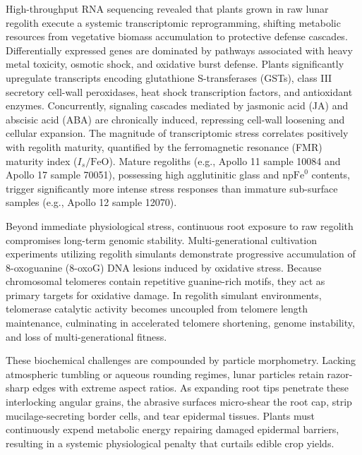 High-throughput RNA sequencing revealed that plants grown in raw lunar regolith execute a systemic transcriptomic reprogramming, shifting metabolic resources from vegetative biomass accumulation to protective defense cascades\cite{paul2022plants,krejci2026lunar}. Differentially expressed genes are dominated by pathways associated with heavy metal toxicity, osmotic shock, and oxidative burst defense\cite{paul2022plants,krejci2026lunar}. Plants significantly upregulate transcripts encoding glutathione S-transferases (GSTs), class III secretory cell-wall peroxidases, heat shock transcription factors, and antioxidant enzymes\cite{paul2022plants,krejci2026lunar}. Concurrently, signaling cascades mediated by jasmonic acid (JA) and abscisic acid (ABA) are chronically induced, repressing cell-wall loosening and cellular expansion\cite{paul2022plants,ming1989lunar}. The magnitude of transcriptomic stress correlates positively with regolith maturity, quantified by the ferromagnetic resonance (FMR) maturity index ($I_s/\mathrm{FeO}$)\cite{paul2022plants,morris1976surface}. Mature regoliths (e.g., Apollo 11 sample 10084 and Apollo 17 sample 70051), possessing high agglutinitic glass and $\mathrm{npFe}^0$ contents, trigger significantly more intense stress responses than immature sub-surface samples (e.g., Apollo 12 sample 12070)\cite{paul2022plants}.

Beyond immediate physiological stress, continuous root exposure to raw regolith compromises long-term genomic stability\cite{barbero2024telomere,shippen2019telomere}. Multi-generational cultivation experiments utilizing regolith simulants demonstrate progressive accumulation of 8-oxoguanine (8-oxoG) DNA lesions induced by oxidative stress\cite{barbero2024telomere}. Because chromosomal telomeres contain repetitive guanine-rich motifs, they act as primary targets for oxidative damage\cite{barbero2024telomere,min2023protection}. In regolith simulant environments, telomerase catalytic activity becomes uncoupled from telomere length maintenance, culminating in accelerated telomere shortening, genome instability, and loss of multi-generational fitness\cite{ming1989lunar,barbero2024telomere}.

These biochemical challenges are compounded by particle morphometry\cite{paul2022plants,ming1989lunar,fackrell2024mechanical}. Lacking atmospheric tumbling or aqueous rounding regimes, lunar particles retain razor-sharp edges with extreme aspect ratios\cite{paul2022plants,ming1989lunar,fackrell2024mechanical}. As expanding root tips penetrate these interlocking angular grains, the abrasive surfaces micro-shear the root cap, strip mucilage-secreting border cells, and tear epidermal tissues\cite{ming1989lunar,hendrix2024reactivity}. Plants must continuously expend metabolic energy repairing damaged epidermal barriers, resulting in a systemic physiological penalty that curtails edible crop yields\cite{ming1989lunar,fackrell2024mechanical}.


